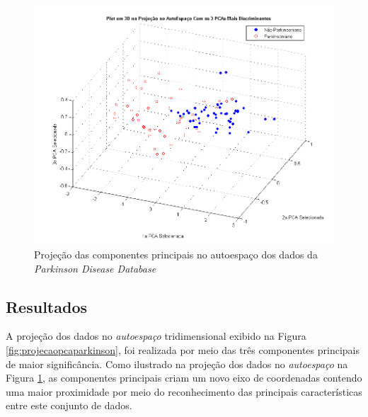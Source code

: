 \begin{figure}[!htbp]
 \centering
 \includegraphics[scale=0.70]{./img/projecaopca.png}
 \caption[Projeção das componentes principais no autoespaço dos dados da \textit{Parkinson Disease Database}]{Projeção das componentes principais no autoespaço dos dados da \textit{Parkinson Disease Database} ~\cite{physionet}}
 \label{fig:projecao_autoespaco}
\end{figure}

\subsection{Resultados}
A projeção dos dados no \textit{autoespaço} tridimensional exibido na Figura \ref{fig:projecaopcaparkinson}, foi realizada por meio das três componentes principais de maior significância. Como ilustrado na projeção dos dados no \textit{autoespaço} na Figura \ref{fig:projecao_autoespaco}, as componentes principais criam um novo eixo de coordenadas contendo uma maior proximidade por meio do reconhecimento das principais características entre este conjunto de dados.

